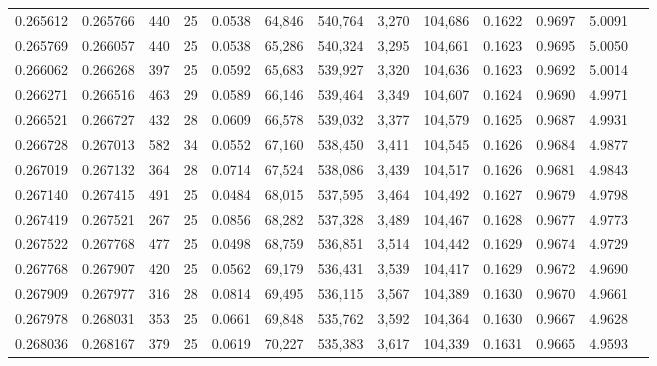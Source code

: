 \begin{tabular}{rrrrrrrrrrrrr}
0.265612 & 0.265766 &   440 &  25 &                                     0.0538 &  64,846 & 540,764 &   3,270 & 104,686 & 0.1622 & 0.9697 & 5.0091 \\
0.265769 & 0.266057 &   440 &  25 &                                     0.0538 &  65,286 & 540,324 &   3,295 & 104,661 & 0.1623 & 0.9695 & 5.0050 \\
0.266062 & 0.266268 &   397 &  25 &                                     0.0592 &  65,683 & 539,927 &   3,320 & 104,636 & 0.1623 & 0.9692 & 5.0014 \\
0.266271 & 0.266516 &   463 &  29 &                                     0.0589 &  66,146 & 539,464 &   3,349 & 104,607 & 0.1624 & 0.9690 & 4.9971 \\
0.266521 & 0.266727 &   432 &  28 &                                     0.0609 &  66,578 & 539,032 &   3,377 & 104,579 & 0.1625 & 0.9687 & 4.9931 \\
0.266728 & 0.267013 &   582 &  34 &                                     0.0552 &  67,160 & 538,450 &   3,411 & 104,545 & 0.1626 & 0.9684 & 4.9877 \\
0.267019 & 0.267132 &   364 &  28 &                                     0.0714 &  67,524 & 538,086 &   3,439 & 104,517 & 0.1626 & 0.9681 & 4.9843 \\
0.267140 & 0.267415 &   491 &  25 &                                     0.0484 &  68,015 & 537,595 &   3,464 & 104,492 & 0.1627 & 0.9679 & 4.9798 \\
0.267419 & 0.267521 &   267 &  25 &                                     0.0856 &  68,282 & 537,328 &   3,489 & 104,467 & 0.1628 & 0.9677 & 4.9773 \\
0.267522 & 0.267768 &   477 &  25 &                                     0.0498 &  68,759 & 536,851 &   3,514 & 104,442 & 0.1629 & 0.9674 & 4.9729 \\
0.267768 & 0.267907 &   420 &  25 &                                     0.0562 &  69,179 & 536,431 &   3,539 & 104,417 & 0.1629 & 0.9672 & 4.9690 \\
0.267909 & 0.267977 &   316 &  28 &                                     0.0814 &  69,495 & 536,115 &   3,567 & 104,389 & 0.1630 & 0.9670 & 4.9661 \\
0.267978 & 0.268031 &   353 &  25 &                                     0.0661 &  69,848 & 535,762 &   3,592 & 104,364 & 0.1630 & 0.9667 & 4.9628 \\
0.268036 & 0.268167 &   379 &  25 &                                     0.0619 &  70,227 & 535,383 &   3,617 & 104,339 & 0.1631 & 0.9665 & 4.9593 \\

\end{tabular}
